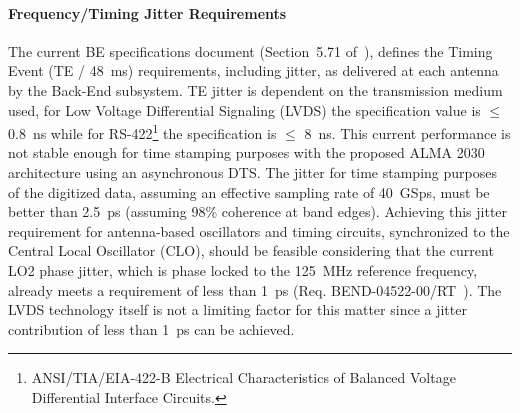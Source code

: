 \paragraph{Frequency/Timing Jitter Requirements}
The current BE specifications document (Section~5.71 of~\cite{BEreqs}), defines the Timing Event (TE / 48~ms) requirements, including jitter, as delivered at each antenna by the Back-End subsystem. TE jitter is dependent on the transmission medium used, for Low Voltage Differential Signaling (LVDS) the specification value is $\leq$ 0.8~ns while for RS-422\footnote{ANSI/TIA/EIA-422-B Electrical Characteristics of Balanced Voltage Differential
Interface Circuits.} the specification is $\leq$ 8~ns. This current performance is not stable enough for time stamping purposes with the proposed ALMA 2030 architecture using an asynchronous DTS.
The jitter for time stamping purposes of the digitized data, assuming an effective sampling rate of 40~GSps, must be better than 2.5~ps (assuming 98\% coherence at band edges). Achieving this jitter requirement for antenna-based oscillators and timing circuits, synchronized to the Central Local Oscillator (CLO), should be feasible considering that the current LO2 phase jitter, which is phase locked to the 125~MHz reference frequency, already meets a requirement of less than 1~ps (Req. BEND-04522-00/RT~\cite{BEreqs}). The LVDS technology itself is not a limiting factor for this matter since a jitter contribution of less than 1~ps can be achieved.


